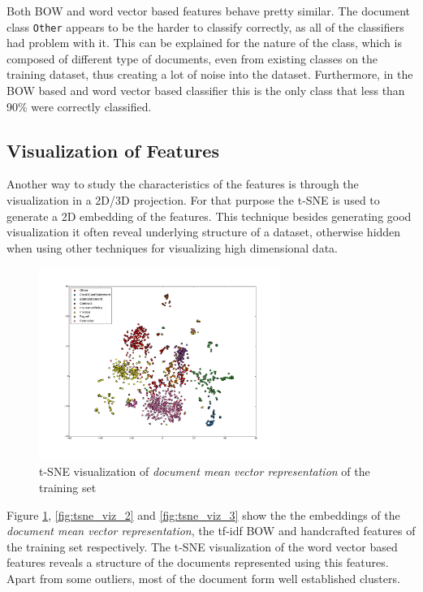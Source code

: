 Both \ac{BOW} and word vector based features behave pretty similar. The
document class \texttt{Other} appears  to be the harder to classify
correctly, as all of the classifiers  had problem with it. This can be explained
for the nature of the class, which is composed  of different type of
documents, even from existing classes on the training dataset, thus creating
a lot of noise into the dataset. Furthermore, in the \ac{BOW} based and word
vector based classifier this is the only class that less than 90\% were
correctly classified.

\subsection{Visualization of Features}
\label{sec:sub_w2v4tc_viz_features}

Another way to study  the characteristics of the features   is through the
visualization in a 2D/3D projection. For that purpose the \ac{t-SNE} \cite{maaten2008visualizing} is used
to generate a 2D embedding of the features. This technique besides generating
good visualization it often reveal underlying structure of a dataset,
otherwise hidden when using other techniques for visualizing high dimensional
data.

\begin{figure}[ht!]
	\begin{center}

			\includegraphics[width=0.7\textwidth]{images/tse-document-mean-vectors.pdf} 

	\end{center}
	\caption{\ac{t-SNE} visualization of \textit{document mean
           vector representation} of the training set}
	\label{fig:tsne_viz_1}
\end{figure}

Figure \ref{fig:tsne_viz_1}, \ref{fig:tsne_viz_2} and \ref{fig:tsne_viz_3}
show the the embeddings of the \textit{document mean vector representation},
the \ac{tf-idf} \ac{BOW}  and handcrafted features of the training set
respectively. The \ac{t-SNE} visualization of the word vector  based features
reveals a structure of the documents represented using this features. Apart from some outliers, most of the document form
well established clusters.


